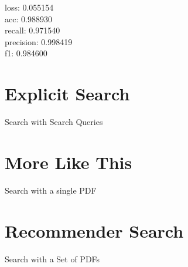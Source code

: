       
loss: 0.055154 \\
acc: 0.988930 \\
recall: 0.971540 \\
precision: 0.998419 \\
f1: 0.984600 \\



\section{Explicit Search}
\label{sec:explicit-search}

Search with Search Queries

\section{More Like This} %
\label{sec:more-like-this}

Search with a single PDF

\section{Recommender Search}
\label{sec:recommender-search}

Search with a Set of PDFs